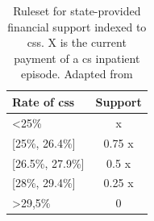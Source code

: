 \begin{table}[htbp]
  \centering
  \caption[Ruleset for state-provided financial support indexed to \acp{cs}.]{Ruleset for state-provided financial support indexed to \acp{cs}. X is the current payment of a \ac{cs} inpatient episode. Adapted from \cite{acssTermosReferenciaPara2023}}
  \label{tab:corrections}
  \renewcommand{\arraystretch}{1.2} %
  \setlength{\tabcolsep}{12pt} %
  \begin{tabular}{lc}
      \hline
Rate of \acp{cs}   & Support \\
    \hline
\textless 25\%       & x       \\
{[}25\%, 26.4\%{]}   & 0.75 x   \\
{[}26.5\%, 27.9\%{]} & 0.5 x    \\
{[}28\%, 29.4\%{]}   & 0.25 x   \\
\textgreater{}29,5\% & 0      \\
    \hline
\end{tabular}
\end{table}
